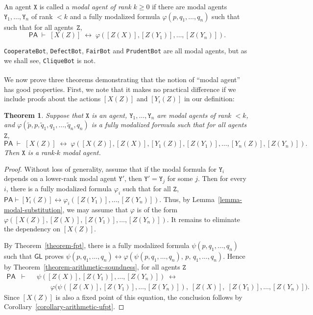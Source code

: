 \documentclass[12pt, letterpaper]{article}
\newtheorem{theorem}{Theorem}[section]
\numberwithin{equation}{section}
\newenvironment{definition}[1][Definition]{\begin{trivlist}
\item[\hskip \labelsep {\bfseries #1}]}{\end{trivlist}}
\begin{document}
\begin{definition}
An agent $\texttt X$ is called a \emph{modal agent of rank $k\geq 0$} if there are modal agents $\texttt Y_1,\dotsc,\texttt Y_n$ of rank $<k$ and a fully modalized formula $\varphi(p,q_1,\dotsc,q_n)$ such that such that for all agents~$\texttt Z$,
\[
\mathsf{PA}\;\vdash\;[X(Z)]\;\leftrightarrow\;\varphi([Z(X)],[Z(Y_1)],\dotsc,[Z(Y_n)]).
\]
\end{definition}
\texttt{CooperateBot}, \texttt{DefectBot}, \texttt{FairBot} and \texttt{PrudentBot} are all modal agents, but as we shall see, \texttt{CliqueBot} is not.\\
\\
We now prove three theorems demonstrating that the notion of ``modal agent'' has good properties. First, we note that it makes no practical difference if we include proofs about the actions $[X(Z)]$ and $[Y_i(Z)]$ in our definition: 
\begin{theorem} \label{theorem-self-referential-modal-agents}
Suppose that $\texttt X$ is an agent, $\texttt Y_1,\dotsc,\texttt Y_n$ are modal agents of rank $<k$, and $\varphi(\tilde p,p,\tilde q_1,q_1,\dotsc,\tilde q_n,q_n)$ is a fully modalized formula such that for all agents $\texttt Z$,
\[
\mathsf{PA}\;\vdash\;[X(Z)]\;\leftrightarrow\;\varphi([X(Z)],[Z(X)],[Y_1(Z)],[Z(Y_1)],\dotsc,[Y_n(Z)],[Z(Y_n)]).
\]
Then $\texttt X$ is a rank-$k$ modal agent.
\end{theorem}

\begin{proof}
Without loss of generality, assume that if the modal formula for $\texttt Y_i$ depends on a lower-rank modal agent $\texttt Y'$, then $\texttt Y' = \texttt Y_j$ for some $j$. Then for every~$i$, there is a fully modalized formula $\varphi_i$ such that for all $\texttt Z$, $\mathsf{PA}\vdash[Y_i(Z)]\leftrightarrow\varphi_i([Z(Y_1)],\dots,[Z(Y_n)])$. Thus, by Lemma~\ref{lemma-modal-substitution}, we may assume that $\varphi$ is of the form $\varphi([X(Z)],[Z(X)],[Z(Y_1)],\dotsc,[Z(Y_n)])$. It remains to eliminate the dependency on $[X(Z)]$.

By Theorem~\ref{theorem-fpt}, there is a fully modalized formula $\psi(p,q_1,\dotsc,q_n)$ such that $\mathsf{GL}$ proves $\psi(p,q_1,\dotsc,q_n)\leftrightarrow\varphi(\psi(p,q_1,\dotsc,q_n),\,p,\,q_1,\dotsc,q_n)$. Hence by Theorem~\ref{theorem-arithmetic-soundness}, for all agents $\texttt Z$
\begin{align*}
\mathsf{PA}\;\;\vdash\;\;
& \psi([Z(X)],[Z(Y_1)],\dotsc,[Z(Y_n)])\;\leftrightarrow\; \\
& \qquad\varphi\big(\psi([Z(X)],[Z(Y_1)],\dotsc,[Z(Y_n)]),\;[Z(X)],\;[Z(Y_1)],\dotsc,[Z(Y_n)]\big).
\end{align*}
Since $[X(Z)]$ is also a fixed point of this equation, the conclusion follows by Corollary~\ref{corollary-arithmetic-ufpt}.
\end{proof}
\end{document}

